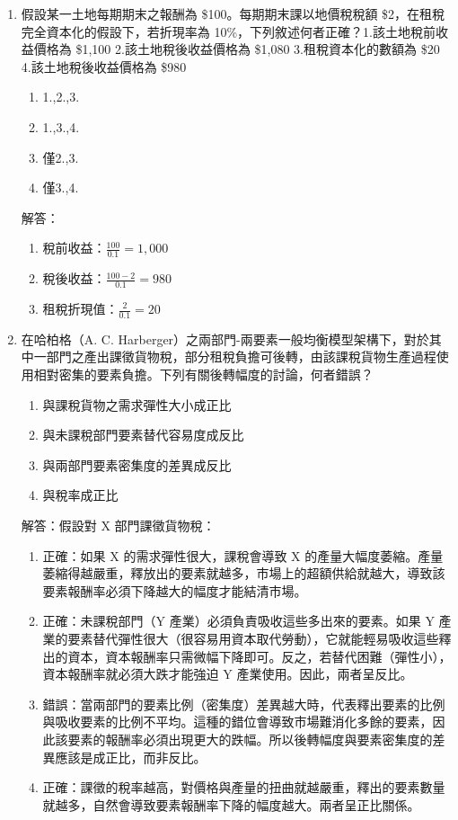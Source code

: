\documentclass[12pt, a4paper]{article}
\begin{document}
\begin{enumerate}
    \item 假設某一土地每期期末之報酬為 \$100。每期期末課以地價稅稅額 \$2，在租稅完全資本化的假設下，若折現率為 10\%，下列敘述何者正確？1.該土地稅前收益價格為 \$1,100 2.該土地稅後收益價格為 \$1,080 3.租稅資本化的數額為 \$20 4.該土地稅後收益價格為 \$980
    \begin{enumerate}[label=\Alph*.]
        \item 1.,2.,3.
        \item 1.,3.,4.
        \item 僅2.,3.
        \item 僅3.,4.
    \end{enumerate}
    解答：
    \begin{enumerate}[1.]
        \item 稅前收益：$\frac{100}{0.1} = 1,000$
        \item 稅後收益：$\frac{100-2}{0.1} = 980$
        \item 租稅折現值：$\frac{2}{0.1} = 20$
    \end{enumerate}

    \item 在哈柏格（A. C. Harberger）之兩部門-兩要素一般均衡模型架構下，對於其中一部門之產出課徵貨物稅，部分租稅負擔可後轉，由該課稅貨物生產過程使用相對密集的要素負擔。下列有關後轉幅度的討論，何者錯誤？
    \begin{enumerate}[label=\Alph*.]
        \item 與課稅貨物之需求彈性大小成正比
        \item 與未課稅部門要素替代容易度成反比
        \item 與兩部門要素密集度的差異成反比
        \item 與稅率成正比
    \end{enumerate}
    解答：假設對 X 部門課徵貨物稅：
    \begin{enumerate}[label=\Alph*.]
        \item 正確：如果 X 的需求彈性很大，課稅會導致 X 的產量大幅度萎縮。產量萎縮得越嚴重，釋放出的要素就越多，市場上的超額供給就越大，導致該要素報酬率必須下降越大的幅度才能結清市場。
        \item 正確：未課稅部門（Y 產業）必須負責吸收這些多出來的要素。如果 Y 產業的要素替代彈性很大（很容易用資本取代勞動），它就能輕易吸收這些釋出的資本，資本報酬率只需微幅下降即可。反之，若替代困難（彈性小），資本報酬率就必須大跌才能強迫 Y 產業使用。因此，兩者呈反比。
        \item 錯誤：當兩部門的要素比例（密集度）差異越大時，代表釋出要素的比例與吸收要素的比例不平均。這種的錯位會導致市場難消化多餘的要素，因此該要素的報酬率必須出現更大的跌幅。所以後轉幅度與要素密集度的差異應該是成正比，而非反比。
        \item 正確：課徵的稅率越高，對價格與產量的扭曲就越嚴重，釋出的要素數量就越多，自然會導致要素報酬率下降的幅度越大。兩者呈正比關係。
    \end{enumerate}


\end{enumerate}
\end{document}
